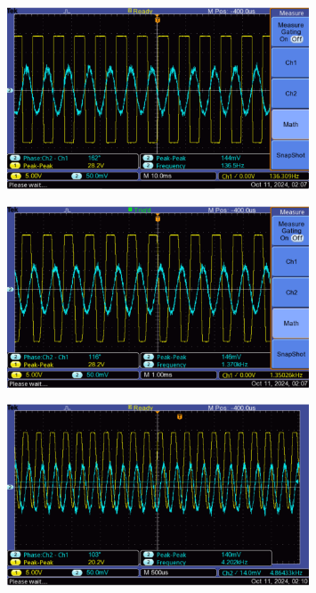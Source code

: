 \documentclass{article}
\begin{document}
\begin{figure}[H]
    \centering
    \includegraphics[width=0.8\textwidth]{img/Lab 7/1_2.png} %
    \caption{}
\end{figure}

\begin{figure}[H]
    \centering
    \includegraphics[width=0.8\textwidth]{img/Lab 7/1_3.png} %
    \caption{}
\end{figure}

\begin{figure}[H]
    \centering
    \includegraphics[width=0.8\textwidth]{img/Lab 7/1_4.png} %
    \caption{}
\end{figure}
\end{document}
